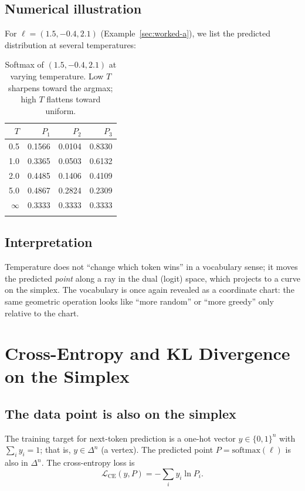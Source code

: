 \documentclass[11pt]{article}
\newcommand{\simplex}[1]{\Delta^{#1}}
\newcommand{\softmax}{\mathrm{softmax}}
\begin{document}
\subsection{Numerical illustration}
\label{sec:temp-num}

For $\ell=(1.5,-0.4,2.1)$ (Example~\ref{sec:worked-a}), we list the predicted
distribution at several temperatures:

\begin{longtable}{@{}rrrr@{}}
\toprule
$T$ & $P_1$ & $P_2$ & $P_3$ \\
\midrule
0.5 & 0.1566 & 0.0104 & 0.8330 \\
1.0 & 0.3365 & 0.0503 & 0.6132 \\
2.0 & 0.4485 & 0.1406 & 0.4109 \\
5.0 & 0.4867 & 0.2824 & 0.2309 \\
$\infty$ & 0.3333 & 0.3333 & 0.3333 \\
\bottomrule
\caption{Softmax of $(1.5,-0.4,2.1)$ at varying temperature. Low $T$ sharpens
toward the argmax; high $T$ flattens toward uniform.}
\label{tab:temp}
\end{longtable}

\subsection{Interpretation}
\label{sec:temp-interp}

Temperature does not ``change which token wins'' in a vocabulary sense; it moves
the predicted \emph{point} along a ray in the dual (logit) space, which projects
to a curve on the simplex. The vocabulary is once again revealed as a coordinate
chart: the same geometric operation looks like ``more random'' or ``more
greedy'' only relative to the chart.

\section{Cross-Entropy and KL Divergence on the Simplex}
\label{sec:kl}

\subsection{The data point is also on the simplex}
\label{sec:kl-data}

The training target for next-token prediction is a one-hot vector
$y\in\{0,1\}^n$ with $\sum_i y_i = 1$; that is, $y\in\simplex{n}$ (a vertex).
The predicted point $P = \softmax(\ell)$ is also in $\simplex{n}$. The
cross-entropy loss is
\[
\mathcal{L}_{\mathrm{CE}}(y,P) = -\sum_i y_i \ln P_i.
\]
\end{document}
